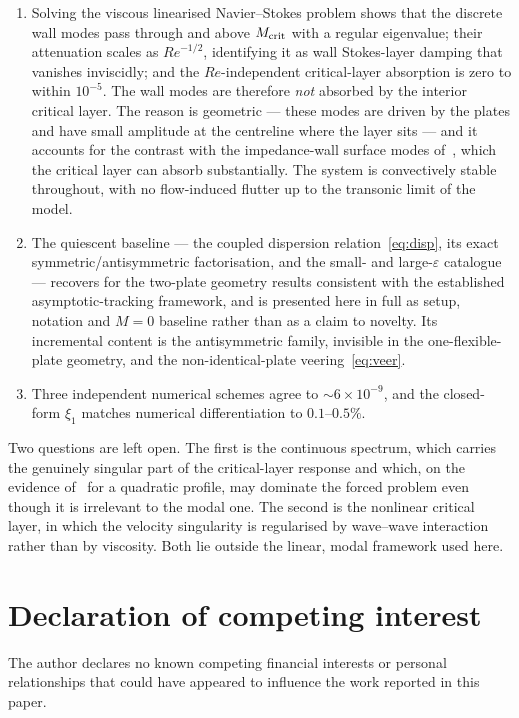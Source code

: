 \documentclass[11pt,a4paper]{article}
\newcommand{\eps}{\varepsilon}
\newcommand{\Rey}{\mathit{Re}}
\theoremstyle{plain}
\theoremstyle{remark}
\begin{document}
\begin{enumerate}[label=\arabic*.,leftmargin=2em,itemsep=3pt]
\item Solving the viscous linearised Navier--Stokes problem shows that the discrete wall modes pass
through and above $M_{\rm crit}$ with a regular eigenvalue; their attenuation scales as $\Rey^{-1/2}$,
identifying it as wall Stokes-layer damping that vanishes inviscidly; and the $\Rey$-independent
critical-layer absorption is zero to within $10^{-5}$. The wall modes are therefore \emph{not} absorbed
by the interior critical layer. The reason is geometric --- these modes are driven by the plates and
have small amplitude at the centreline where the layer sits --- and it accounts for the contrast with
the impedance-wall surface modes of~\cite{brambleydarau}, which the critical layer can absorb
substantially. The system is convectively stable throughout, with no flow-induced flutter up to the
transonic limit of the model.

\item The quiescent baseline --- the coupled dispersion relation~\eqref{eq:disp}, its exact
symmetric/antisymmetric factorisation, and the small- and large-$\eps$ catalogue --- recovers for the
two-plate geometry results consistent with the established asymptotic-\linebreak[1]tracking framework, and is
presented here in full as setup, notation and $M=0$ baseline rather than as a claim to novelty. Its
incremental content is the antisymmetric family, invisible in the one-flexible-plate geometry, and the
non-identical-plate veering~\eqref{eq:veer}.

\item Three independent numerical schemes agree to $\sim6\times10^{-9}$, and the closed-form $\xi_1$
matches numerical differentiation to $0.1$--$0.5\%$.
\end{enumerate}

Two questions are left open. The first is the continuous spectrum, which carries the genuinely singular
part of the critical-layer response and which, on the evidence of~\cite{king2022} for a quadratic
profile, may dominate the forced problem even though it is irrelevant to the modal one. The second is
the nonlinear critical layer, in which the velocity singularity is regularised by wave--wave
interaction rather than by viscosity. Both lie outside the linear, modal framework used here.

\section*{Declaration of competing interest}
The author declares no known competing financial interests or personal relationships that could have
appeared to influence the work reported in this paper.
\end{document}
